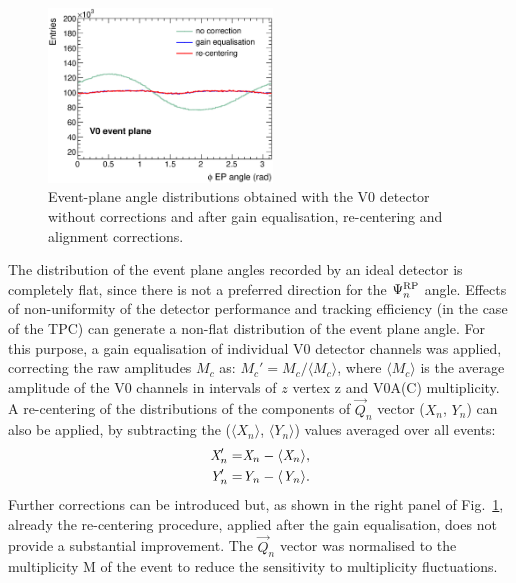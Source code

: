 \begin{figure}
\centering
 \includegraphics[width=0.53\textwidth]{FigCap5/V0EvPlaneDitrib.eps}
 \caption{Event-plane angle distributions obtained with the V0 detector without corrections and after gain equalisation, re-centering and alignment corrections.}
   \label{fig:QoverMCalibration}
\end{figure}



The distribution of the event plane angles recorded by an ideal detector is completely
flat, since there is not a preferred direction for the $\Psi_n^{\rm RP}$ angle.
Effects of non-uniformity of the detector performance and tracking efficiency (in the case of the TPC) 
can generate a non-flat distribution of the event plane angle. 
For this purpose, a gain equalisation of individual 
V0 detector channels was applied, correcting the raw amplitudes $M_c$ 
as: $M_c' = M_c / \langle M_c \rangle$, where $\langle M_c \rangle$ is the average amplitude
of the V0 channels in intervals of $z$ vertex z and V0A(C) multiplicity. 
A re-centering of the distributions of the components
of $\vec{Q}_n$ vector ($X_n$, $Y_n$) can also be applied, by subtracting
the ($\langle X_n\rangle$, $\langle Y_n \rangle$) values averaged over all events:
\begin{equation}
\begin{split}
\emph{{X}}_n' =& \emph{X}_n - \langle \emph{X}_n \rangle,\\
\emph{{Y}}_n' = &\emph{Y}_n - \langle \emph{Y}_n \rangle.
\end{split}
\end{equation}
Further corrections can be introduced but, as shown in the right panel of 
Fig.~\ref{fig:QoverMCalibration}, already the re-centering
procedure, applied after the gain equalisation, does not provide a substantial improvement.
The $\vec{Q}_n$ vector was normalised to the
multiplicity M of the event to reduce the sensitivity to multiplicity
fluctuations. 


